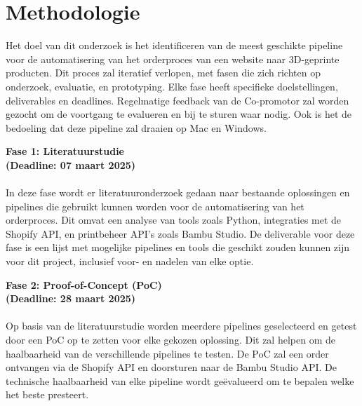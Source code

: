 
\section{Methodologie}%
\label{sec:methodologie}

Het doel van dit onderzoek is het identificeren van de meest geschikte pipeline voor de automatisering van het orderproces van een website naar 3D-geprinte producten. Dit proces zal iteratief verlopen, met fasen die zich richten op onderzoek, evaluatie, en prototyping. Elke fase heeft specifieke doelstellingen, deliverables en deadlines. Regelmatige feedback van de Co-promotor zal worden gezocht om de voortgang te evalueren en bij te sturen waar nodig. Ook is het de bedoeling dat deze pipeline zal draaien op Mac en Windows.
\vspace{2em}

\textbf{Fase 1: Literatuurstudie}\\
\textbf{(Deadline: 07 maart 2025)}\\\\
In deze fase wordt er literatuuronderzoek gedaan naar bestaande oplossingen en pipelines die gebruikt kunnen worden voor de automatisering van het orderproces. Dit omvat een analyse van tools zoals Python, integraties met de Shopify API, en printbeheer API's zoals Bambu Studio. De deliverable voor deze fase is een lijst met mogelijke pipelines en tools die geschikt zouden kunnen zijn voor dit project, inclusief voor- en nadelen van elke optie.
\vspace{2em}

\textbf{Fase 2: Proof-of-Concept (PoC)}\\
\textbf{(Deadline: 28 maart 2025)}\\\\
Op basis van de literatuurstudie worden meerdere pipelines geselecteerd en getest door een PoC op te zetten voor elke gekozen oplossing. Dit zal helpen om de haalbaarheid van de verschillende pipelines te testen. De PoC zal een order ontvangen via de Shopify API en doorsturen naar de Bambu Studio API. De technische haalbaarheid van elke pipeline wordt geëvalueerd om te bepalen welke het beste presteert.
\vspace{1em}

